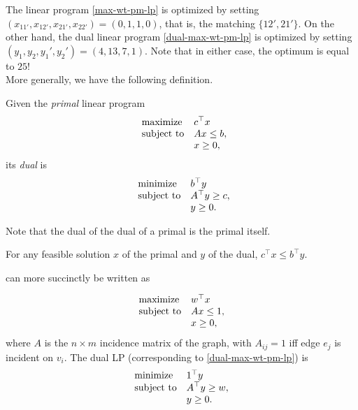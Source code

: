 	The linear program \eqref{max-wt-pm-lp} is optimized by setting $(x_{11'},x_{12'},x_{21'},x_{22'}) = (0,1,1,0)$, that is, the matching $\{12',21'\}$. On the other hand, the dual linear program \eqref{dual-max-wt-pm-lp} is optimized by setting $(y_1,y_2,y_1',y_2') = (4,13,7,1)$. Note that in either case, the optimum is equal to $25$! \\

	More generally, we have the following definition.

	\begin{fdef}
		\label{def:dual}
		Given the \emph{primal} linear program
		\[
		\begin{array}{ll@{}ll}
		\text{maximize}  & \displaystyle c^\top x \\
		\text{subject to} \displaystyle &Ax \le b,\\
		                  &x \ge 0,
		\end{array}
		\]
		its \emph{dual} is
		\[
		\begin{array}{ll@{}ll}
		\text{minimize}  & \displaystyle b^\top y \\
		\text{subject to} \displaystyle &A^\top y \ge c,\\
		                  &y \ge 0.
		\end{array}
		\]
	\end{fdef}

	Note that the dual of the dual of a primal is the primal itself.

	\begin{fprop}
		For any feasible solution $x$ of the primal and $y$ of the dual, $c^\top x \le b^\top y$.
	\end{fprop}



	 can more succinctly be written as
	
	\begin{equation}		
	\label{max-wt-pm-lp-2}
	\begin{array}{ll@{}ll}
	\text{maximize}  & w^\top x &\\
	\text{subject to}& \displaystyle Ax \le 1, &\\
	                 & x \ge 0,&
	\end{array}
	\end{equation}
	where $A$ is the $n \times m$ incidence matrix of the graph, with $A_{ij} = 1$ iff edge $e_j$ is incident on $v_i$. The dual LP (corresponding to \cref{dual-max-wt-pm-lp}) is
	\[
	\begin{array}{ll@{}ll}
	\text{minimize}  & 1^\top y &\\
	\text{subject to}& \displaystyle A^\top y \ge w, \\
	                 & y \ge 0.
	\end{array}
	\]

